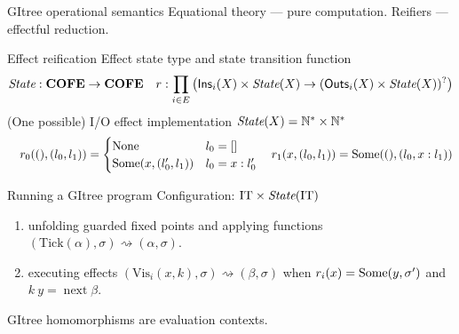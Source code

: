\documentclass[8pt]{beamer}
\newcommand{\Ins}{\mathsf{Ins}}
\newcommand{\Outs}{\mathsf{Outs}}
\newcommand{\Redu}{\rightsquigarrow}
\newcommand{\COFE}{\mathbf{COFE}}
\newcommand{\IT}{\mathrm{IT}}
\newcommand{\gVis}{\mathrm{Vis}}
\newcommand{\Tick}{\mathrm{Tick}}
\DeclareMathOperator*{\Next}{\mathrm{next}}
\begin{document}
  \begin{frame}{GItree operational semantics}
    Equational theory --- pure computation. Reifiers --- effectful reduction.\\
    \begin{block}{Effect reification}
      Effect state type and state transition function
      \[
        \State : \COFE \to \COFE
        \quad
        r : \prod_{i\in E} \left( \Ins_i(X) \times \State(X) \to \option{(\Outs_i(X) \times \State(X))} \right)
      \]
      (One possible) I/O effect implementation \(\textit{State}(X) = \mathbb{N}^\ast \times \mathbb{N}^\ast\)
      \[
        \quad
        r_{0}((),(l_0,l_1)) = \begin{cases}
          \operatorname{None} & l_0 = [] \\
          \operatorname{Some}(x, (l_0',l_1)) & l_0 = x \mathrel{:} l_0'
        \end{cases}
        \quad
        r_{1}(x,(l_0,l_1)) = \operatorname{Some}((), (l_0, x \mathrel{:} l_1))
      \]
    \end{block}
    \begin{block}{Running a GItree program}
      Configuration: \(\IT \times \State(\IT)\)
      \begin{enumerate}
        \item unfolding guarded fixed points and applying functions \((\Tick(\alpha),\sigma) \Redu (\alpha,\sigma)\).
        \item executing effects \((\gVis_i(x, k),\sigma) \Redu (\beta,\sigma)\) when \(r_i(x) = \operatorname{Some}(y,\sigma')\) and \(k\ y = \Next \beta\).
      \end{enumerate}
      GItree homomorphisms are evaluation contexts.
    \end{block}
  \end{frame}
\end{document}
